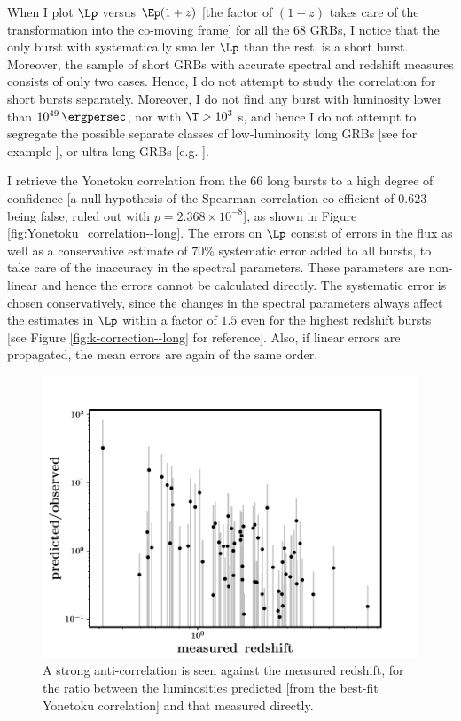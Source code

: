 When I plot $\Lp$ versus $\Ep (1+z)$ [the factor of $(1+z)$ takes care of the transformation into the co-moving frame] for all the 68 GRBs, I notice that the only burst with systematically smaller $\Lp$ than the rest, is a short burst. Moreover, the sample of short GRBs with accurate spectral and redshift measures consists of only two cases. Hence, I do not attempt to study the correlation for short bursts separately. Moreover, I do not find any burst with luminosity lower than $10^{49} \, \ergpersec $, nor with $\T > 10^3$ s, and hence I do not attempt to segregate the possible separate classes of low-luminosity long GRBs [see for example \cite{Liang_et_al.-2007-ApJ}], or ultra-long GRBs [e.g. \cite{Levan_et_al.-2014-ApJ}].

I retrieve the Yonetoku correlation from the $66$ long bursts to a high degree of confidence [a null-hypothesis of the Spearman correlation co-efficient of $0.623$ being false, ruled out with $p = 2.368 \times 10^{-8}$], as shown in Figure \ref{fig:Yonetoku_correlation--long}. The errors on $\Lp$ consist of errors in the flux as well as a conservative estimate of $70 \%$ systematic error added to all bursts, to take care of the inaccuracy in the spectral parameters. These parameters are non-linear and hence the errors cannot be calculated directly. The systematic error is chosen conservatively, since the changes in the spectral parameters always affect the estimates in $\Lp$ within a factor of $1.5$ even for the highest redshift bursts [see Figure \ref{fig:k-correction--long} for reference]. Also, if linear errors are propagated, the mean errors are again of the same order.

\begin{figure}
\begin{center}
\includegraphics[scale=0.5]{scatter_with_measured_redshift--my_bestfit}
\caption[Systematic trend in the ratio of observed and predicted luminosities]{A strong anti-correlation is seen against the measured redshift, for the ratio between the luminosities predicted [from the best-fit Yonetoku correlation] and that measured directly.}
\label{fig:correlation_of_ratio_with_measured_z}
\end{center}
\end{figure}


